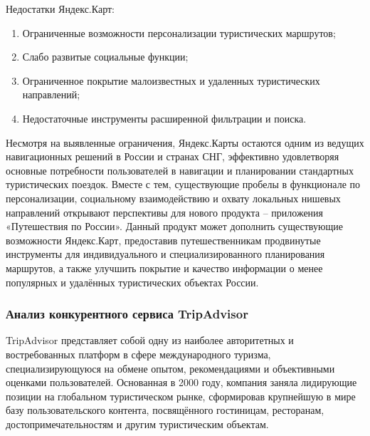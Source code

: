 Недостатки Яндекс.Карт:
\begin{enumerate}
    \item Ограниченные возможности персонализации туристических маршрутов;
    \item Слабо развитые социальные функции;
    \item Ограниченное покрытие малоизвестных и удаленных туристических направлений;
    \item Недостаточные инструменты расширенной фильтрации и поиска.
\end{enumerate}

Несмотря на выявленные ограничения, Яндекс.Карты остаются одним из ведущих навигационных решений в России и странах СНГ, эффективно удовлетворяя основные потребности пользователей в навигации и планировании стандартных туристических поездок. Вместе с тем, существующие пробелы в функционале по персонализации, социальному взаимодействию и охвату локальных нишевых направлений открывают перспективы для нового продукта – приложения «Путешествия по России». Данный продукт может дополнить существующие возможности Яндекс.Карт, предоставив путешественникам продвинутые инструменты для индивидуального и специализированного планирования маршрутов, а также улучшить покрытие и качество информации о менее популярных и удалённых туристических объектах России.

\subsubsection*{Анализ конкурентного сервиса TripAdvisor}
TripAdvisor представляет собой одну из наиболее авторитетных и востребованных платформ в сфере международного туризма, специализирующуюся на обмене опытом, рекомендациями и объективными оценками пользователей. Основанная в 2000 году, компания заняла лидирующие позиции на глобальном туристическом рынке, сформировав крупнейшую в мире базу пользовательского контента, посвящённого гостиницам, ресторанам, достопримечательностям и другим туристическим объектам.

